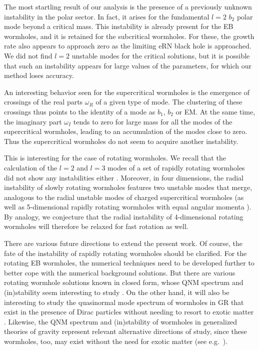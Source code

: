 \documentclass[11pt,a4paper]{article}
\begin{document}
The most startling result of our analysis is the presence of a previously unknown instability in the polar sector.
In fact, it arises for the fundamental $l=2$ $b_2$  polar mode beyond a critical mass.
This instability is already present for the EB wormholes, and it is retained for the subcritical wormholes.
For these, the growth rate also appears to approach zero as the limiting eRN black hole is approached.
We did not find $l=2$ unstable modes for the critical solutions,
but it is possible that such an instability appears for large values of the parameters, for which our method loses accuracy.

An interesting behavior seen for the supercritical wormholes is the emergence of crossings of the real parts $\omega_R$ of a given type of mode.
The clustering of these crossings thus points to the identity of a mode as $b_1$, $b_2$ or EM.
At the same time, the imaginary part $\omega_I$ tends to zero for large mass for all the modes of the supercritical wormholes, leading to an accumulation of the modes close to zero.
Thus the supercritical wormholes do not seem to acquire another instability.

This is interesting for the case of rotating wormholes.
We recall that the calculation of the $l=2$ and $l=3$ modes of a set of rapidly rotating wormholes did not show any instabilities either \cite{Khoo:2024yeh}.
Moreover, in four dimensions, the radial instability of slowly rotating wormholes features two unstable modes that merge, analogous to the radial unstable modes of charged supercritical wormholes \cite{Azad:2023iju}
(as well as 5-dimensional rapidly rotating wormholes with equal angular momenta \cite{Dzhunushaliev:2013jja}).
By analogy, we conjecture that the radial instability of 4-dimensional rotating wormholes will therefore be relaxed for fast rotation as well.

There are various future directions to extend the present work.
Of course, the fate of the instability of rapidly rotating wormholes should be clarified.
For the rotating EB wormholes, the numerical techniques need to be developed further to better cope with the numerical background solutions.
But there are various rotating wormhole solutions known in closed form, whose QNM spectrum and (in)stability seem interesting to study \cite{Cisterna:2023uqf,Batic:2026vzt}. 
On the other hand, it will also be interesting to study the quasinormal mode spectrum of wormholes in GR that exist in the presence of Dirac particles without needing to resort to exotic matter \cite{Blazquez-Salcedo:2020czn,Konoplya:2021hsm,Blazquez-Salcedo:2021udn,Dzhunushaliev:2025ntr}.
Likewise, the QNM spectrum and (in)stability of wormholes in generalized theories of gravity represent relevant alternative directions of study, since these wormholes, too, may exist without the need for exotic matter (see e.g.~\cite{Kanti:2011jz,Harko:2013yb,Bakopoulos:2021liw,DeFalco:2023twb,Ilyas:2023rde,Bronnikov:2025zgw}).
\end{document}
